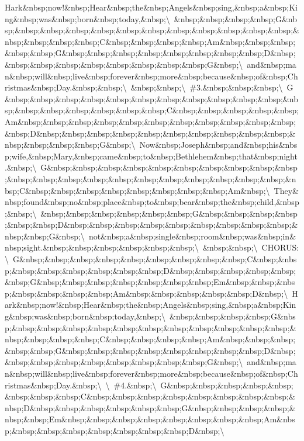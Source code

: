 \documentclass[]{book}
\begin{document}
Hark\&nbsp;now!\&nbsp;Hear\&nbsp;the\&nbsp;Angels\&nbsp;sing,\&nbsp;a\&nbsp;King\&nbsp;was\&nbsp;born\&nbsp;today,\&nbsp;\textbackslash{}\ \&nbsp;\&nbsp;\&nbsp;\&nbsp;G\&nbsp;\&nbsp;\&nbsp;\&nbsp;\&nbsp;\&nbsp;\&nbsp;\&nbsp;\&nbsp;\&nbsp;\&nbsp;\&nbsp;\&nbsp;\&nbsp;\&nbsp;\&nbsp;C\&nbsp;\&nbsp;\&nbsp;\&nbsp;Am\&nbsp;\&nbsp;\&nbsp;\&nbsp;\&nbsp;G\&nbsp;\&nbsp;\&nbsp;\&nbsp;\&nbsp;\&nbsp;\&nbsp;\&nbsp;D\&nbsp;\&nbsp;\&nbsp;\&nbsp;\&nbsp;\&nbsp;\&nbsp;\&nbsp;\&nbsp;G\&nbsp;\textbackslash{}\ and\&nbsp;man\&nbsp;will\&nbsp;live\&nbsp;forever\&nbsp;more\&nbsp;because\&nbsp;of\&nbsp;Christmas\&nbsp;Day.\&nbsp;\&nbsp;\textbackslash{}\ \&nbsp;\&nbsp;\textbackslash{}\ \#3.\&nbsp;\&nbsp;\&nbsp;\textbackslash{}\ G\&nbsp;\&nbsp;\&nbsp;\&nbsp;\&nbsp;\&nbsp;\&nbsp;\&nbsp;\&nbsp;\&nbsp;\&nbsp;\&nbsp;\&nbsp;\&nbsp;\&nbsp;\&nbsp;\&nbsp;\&nbsp;C\&nbsp;\&nbsp;\&nbsp;\&nbsp;\&nbsp;Am\&nbsp;\&nbsp;\&nbsp;\&nbsp;\&nbsp;\&nbsp;\&nbsp;\&nbsp;\&nbsp;\&nbsp;\&nbsp;\&nbsp;D\&nbsp;\&nbsp;\&nbsp;\&nbsp;\&nbsp;\&nbsp;\&nbsp;\&nbsp;\&nbsp;\&nbsp;\&nbsp;\&nbsp;\&nbsp;\&nbsp;G\&nbsp;\textbackslash{}\ Now\&nbsp;Joseph\&nbsp;and\&nbsp;his\&nbsp;wife,\&nbsp;Mary,\&nbsp;came\&nbsp;to\&nbsp;Bethlehem\&nbsp;that\&nbsp;night.\&nbsp;\textbackslash{}\ G\&nbsp;\&nbsp;\&nbsp;\&nbsp;\&nbsp;\&nbsp;\&nbsp;\&nbsp;\&nbsp;\&nbsp;\&nbsp;\&nbsp;\&nbsp;\&nbsp;\&nbsp;\&nbsp;\&nbsp;\&nbsp;\&nbsp;\&nbsp;\&nbsp;\&nbsp;C\&nbsp;\&nbsp;\&nbsp;\&nbsp;\&nbsp;\&nbsp;\&nbsp;\&nbsp;Am\&nbsp;\textbackslash{}\ They\&nbsp;found\&nbsp;no\&nbsp;place\&nbsp;to\&nbsp;bear\&nbsp;the\&nbsp;child,\&nbsp;\&nbsp;\textbackslash{}\ \&nbsp;\&nbsp;\&nbsp;\&nbsp;\&nbsp;\&nbsp;G\&nbsp;\&nbsp;\&nbsp;\&nbsp;\&nbsp;\&nbsp;D\&nbsp;\&nbsp;\&nbsp;\&nbsp;\&nbsp;\&nbsp;\&nbsp;\&nbsp;\&nbsp;\&nbsp;\&nbsp;G\&nbsp;\textbackslash{}\ not\&nbsp;a\&nbsp;single\&nbsp;room\&nbsp;was\&nbsp;in\&nbsp;sight.\&nbsp;\&nbsp;\&nbsp;\&nbsp;\&nbsp;\&nbsp;\textbackslash{}\ \&nbsp;\&nbsp;\textbackslash{}\ CHORUS:\textbackslash{}\ G\&nbsp;\&nbsp;\&nbsp;\&nbsp;\&nbsp;\&nbsp;\&nbsp;\&nbsp;\&nbsp;C\&nbsp;\&nbsp;\&nbsp;\&nbsp;\&nbsp;\&nbsp;\&nbsp;\&nbsp;D\&nbsp;\&nbsp;\&nbsp;\&nbsp;\&nbsp;\&nbsp;G\&nbsp;\&nbsp;\&nbsp;\&nbsp;\&nbsp;\&nbsp;\&nbsp;Em\&nbsp;\&nbsp;\&nbsp;\&nbsp;\&nbsp;\&nbsp;\&nbsp;Am\&nbsp;\&nbsp;\&nbsp;\&nbsp;\&nbsp;D\&nbsp;\textbackslash{}\ Hark\&nbsp;now!\&nbsp;Hear\&nbsp;the\&nbsp;Angels\&nbsp;sing,\&nbsp;a\&nbsp;King\&nbsp;was\&nbsp;born\&nbsp;today,\&nbsp;\textbackslash{}\ \&nbsp;\&nbsp;\&nbsp;\&nbsp;G\&nbsp;\&nbsp;\&nbsp;\&nbsp;\&nbsp;\&nbsp;\&nbsp;\&nbsp;\&nbsp;\&nbsp;\&nbsp;\&nbsp;\&nbsp;\&nbsp;\&nbsp;\&nbsp;C\&nbsp;\&nbsp;\&nbsp;\&nbsp;Am\&nbsp;\&nbsp;\&nbsp;\&nbsp;\&nbsp;G\&nbsp;\&nbsp;\&nbsp;\&nbsp;\&nbsp;\&nbsp;\&nbsp;\&nbsp;D\&nbsp;\&nbsp;\&nbsp;\&nbsp;\&nbsp;\&nbsp;\&nbsp;\&nbsp;\&nbsp;G\&nbsp;\textbackslash{}\ and\&nbsp;man\&nbsp;will\&nbsp;live\&nbsp;forever\&nbsp;more\&nbsp;because\&nbsp;of\&nbsp;Christmas\&nbsp;Day.\&nbsp;\textbackslash{}\ \textbackslash{}\ \#4.\&nbsp;\textbackslash{}\ G\&nbsp;\&nbsp;\&nbsp;\&nbsp;\&nbsp;\&nbsp;\&nbsp;\&nbsp;C\&nbsp;\&nbsp;\&nbsp;\&nbsp;\&nbsp;\&nbsp;\&nbsp;\&nbsp;\&nbsp;D\&nbsp;\&nbsp;\&nbsp;\&nbsp;\&nbsp;\&nbsp;G\&nbsp;\&nbsp;\&nbsp;\&nbsp;\&nbsp;\&nbsp;Em\&nbsp;\&nbsp;\&nbsp;\&nbsp;\&nbsp;\&nbsp;\&nbsp;\&nbsp;Am\&nbsp;\&nbsp;\&nbsp;\&nbsp;\&nbsp;\&nbsp;\&nbsp;\&nbsp;D\&nbsp;\textbackslash{}\ 
\end{document}
